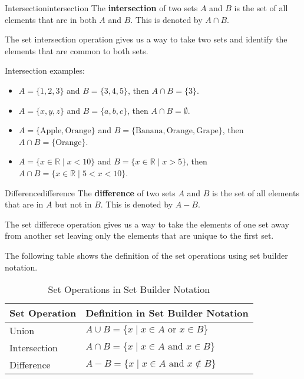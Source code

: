 \begin{definition}{Intersection}{intersection}
  The \textbf{intersection} of two sets \( A \) and \( B \) is the set of all
  elements that are in both \( A \) and \( B \). This is denoted by \( A \cap B \).
\end{definition}

The set intersection operation gives us a way to take two sets and identify the elements
that are common to both sets.

Intersection examples:
\begin{itemize}
  \item \( A = \{ 1, 2, 3 \} \) and \( B = \{ 3, 4, 5 \} \), then \( A \cap B = \{ 3 \} \).
  \item \( A = \{ x, y, z \} \) and \( B = \{ a, b, c \} \), then \( A \cap B = \emptyset \).
  \item \( A = \{ \text{Apple}, \text{Orange} \} \) and \( B = \{ \text{Banana}, \text{Orange}, \text{Grape} \} \), then
  \( A \cap B = \{ \text{Orange} \} \).
  \item \( A = \{ x \in \mathbb{R} \mid x < 10 \} \) and \( B = \{ x \in \mathbb{R} \mid x > 5 \} \), then
  \( A \cap B = \{ x \in \mathbb{R} \mid 5 < x < 10 \} \).
\end{itemize}

\begin{definition}{Difference}{difference}
  The \textbf{difference} of two sets \( A \) and \( B \) is the set of all
  elements that are in \( A \) but not in \( B \). This is denoted by \( A - B \).
\end{definition}

The set differece operation gives us a way to take the elements of one set away from another set
leaving only the elements that are unique to the first set.

The following table shows the definition of the set operations using set builder notation.
\begin{table}[H]
  \centering
  \begin{tabular}{p{1in} p{3in}}
    \toprule
    \textbf{Set Operation} & \textbf{Definition in Set Builder Notation} \\
    \midrule
    Union & \( A \cup B = \{ x \mid x \in A \text{ or } x \in B \} \) \\
    Intersection & \( A \cap B = \{ x \mid x \in A \text{ and } x \in B \} \) \\
    Difference & \( A - B = \{ x \mid x \in A \text{ and } x \notin B \} \) \\
    \bottomrule
  \end{tabular}
  \caption{Set Operations in Set Builder Notation}
\end{table}

